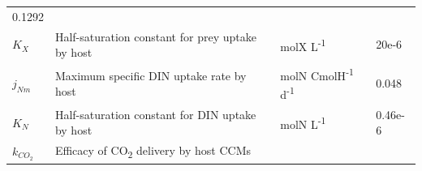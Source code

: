 \documentclass[]{elsarticle} %
\begin{document}
\begin{longtable}[c]{@{}llll@{}}
\begin{minipage}[t]{0.10\columnwidth}
0.1292
\strut\end{minipage}\tabularnewline
\begin{minipage}[t]{0.10\columnwidth}\raggedright\strut
\(K_X\)
\strut\end{minipage} &
\begin{minipage}[t]{0.48\columnwidth}\raggedright\strut
Half-saturation constant for prey uptake by host
\strut\end{minipage} &
\begin{minipage}[t]{0.25\columnwidth}\raggedright\strut
molX L\textsuperscript{-1}
\strut\end{minipage} &
\begin{minipage}[t]{0.10\columnwidth}\raggedright\strut
20e-6
\strut\end{minipage}\tabularnewline
\begin{minipage}[t]{0.10\columnwidth}\raggedright\strut
\(j_{Nm}\)
\strut\end{minipage} &
\begin{minipage}[t]{0.48\columnwidth}\raggedright\strut
Maximum specific DIN uptake rate by host
\strut\end{minipage} &
\begin{minipage}[t]{0.25\columnwidth}\raggedright\strut
molN CmolH\textsuperscript{-1} d\textsuperscript{-1}
\strut\end{minipage} &
\begin{minipage}[t]{0.10\columnwidth}\raggedright\strut
0.048
\strut\end{minipage}\tabularnewline
\begin{minipage}[t]{0.10\columnwidth}\raggedright\strut
\(K_N\)
\strut\end{minipage} &
\begin{minipage}[t]{0.48\columnwidth}\raggedright\strut
Half-saturation constant for DIN uptake by host
\strut\end{minipage} &
\begin{minipage}[t]{0.25\columnwidth}\raggedright\strut
molN L\textsuperscript{-1}
\strut\end{minipage} &
\begin{minipage}[t]{0.10\columnwidth}\raggedright\strut
0.46e-6
\strut\end{minipage}\tabularnewline
\begin{minipage}[t]{0.10\columnwidth}\raggedright\strut
\(k_{CO_2}\)
\strut\end{minipage} &
\begin{minipage}[t]{0.48\columnwidth}\raggedright\strut
Efficacy of CO\textsubscript{2} delivery by host CCMs

\end{minipage}
\end{longtable}
\end{document}
